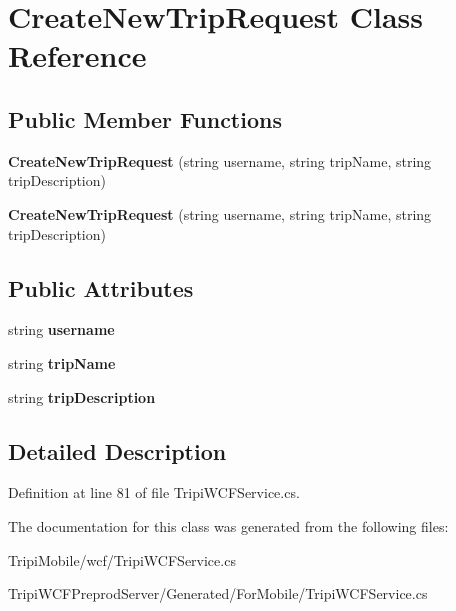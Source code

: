 \hypertarget{class_create_new_trip_request}{
\section{CreateNewTripRequest Class Reference}
\label{class_create_new_trip_request}
}
\subsection*{Public Member Functions}
\begin{DoxyCompactItemize}
\item 
\hypertarget{class_create_new_trip_request_a9c08c71f4f864ed3b4d86ed3ddf9083a}{
{\bfseries CreateNewTripRequest} (string username, string tripName, string tripDescription)}
\label{class_create_new_trip_request_a9c08c71f4f864ed3b4d86ed3ddf9083a}

\item 
\hypertarget{class_create_new_trip_request_a9c08c71f4f864ed3b4d86ed3ddf9083a}{
{\bfseries CreateNewTripRequest} (string username, string tripName, string tripDescription)}
\label{class_create_new_trip_request_a9c08c71f4f864ed3b4d86ed3ddf9083a}

\end{DoxyCompactItemize}
\subsection*{Public Attributes}
\begin{DoxyCompactItemize}
\item 
\hypertarget{class_create_new_trip_request_aacd4c0ee9510b7f99b9edb8ea473efdc}{
string {\bfseries username}}
\label{class_create_new_trip_request_aacd4c0ee9510b7f99b9edb8ea473efdc}

\item 
\hypertarget{class_create_new_trip_request_ad8453bf35def1953797bb18be44c6415}{
string {\bfseries tripName}}
\label{class_create_new_trip_request_ad8453bf35def1953797bb18be44c6415}

\item 
\hypertarget{class_create_new_trip_request_ac46c2ab9daafc6f713a37b36ec70a8cd}{
string {\bfseries tripDescription}}
\label{class_create_new_trip_request_ac46c2ab9daafc6f713a37b36ec70a8cd}

\end{DoxyCompactItemize}


\subsection{Detailed Description}


Definition at line 81 of file TripiWCFService.cs.

The documentation for this class was generated from the following files:\begin{DoxyCompactItemize}
\item 
TripiMobile/wcf/TripiWCFService.cs\item 
TripiWCFPreprodServer/Generated/ForMobile/TripiWCFService.cs\end{DoxyCompactItemize}
